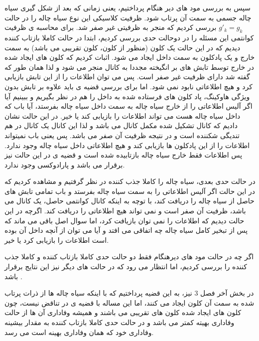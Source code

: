 سپس به بررسی مود های دیر هنگام پرداختیم، یعنی زمانی که بعد از شکل گیری سیاه چاله جسمی به سمت آن پرتاب شود. ظرفیت کلاسیکی این نوع سیاه چاله را در حالت
$g'_k = g_k$
بررسی کردیم که منجر به ظرفیتی غیر صفر شد. برای محاسبه ی ظرفیت کوانتمی
این مسئله را در دوحالت حدی بررسی کردیم، ابتدا در حالت کاملا بازتاب کننده دیدیم که در این حالت یک کلون (منظور از کلون، کلون تقریبی می باشد)
به سمت خارج و یک پادکلون به سمت داخل ایجاد می شود. اثبات کردیم که کلون های ایجاد شده در خارج توسط تابش های بر انگیخته مجددا به کانال 
منجر می شود و لذا همان طور که گفته شد دارای ظرفیت غیر صفر است. پس می توان اطلاعات را از این تابش بازیابی کرد و هیچ اطلاعاتی نابود نمی شود. اما برای بررسی قضیه ی 
باید علاوه بر تابش بدون ویژگی هاوکینگ، پاد کلون های فرستاده شده به داخل را هم در نظر بگیریم و ببینیم آیا اگر آلیس اطلاعاتی را از خارج سیاه چاله به سمت داخل سیاه چاله بفرستد، آیا باب که داخل سیاه چاله هست می تواند اطلاعات را بازیابی کند یا خیر. در این حالت نشان دادیم که کانال تشکیل شده مکمل کانال 
می باشد و لذا این کانال یک کانال در هم تندیگی شکننده است و در نتیجه ظرفیت آن صفر می باشد. پس یعنی باب نمیتواند اطلاعات را از این پادکلون ها بازیابی کند و هیچ اطلاعاتی داخل سیاه چاله وجود ندارد. پس اطلاعات فقط خارج سیاه چاله بازتابیده شده است و قضیه ی 
در این حالت نیز برقرار می باشد و پارادوکسی وجود ندارد.




در حالت حدی بعدی، سیاه چاله را کاملا جذب کننده در نظر گرفتیم و مشاهده کردیم که در این حالت اگر آلیس اطلاعاتی را به سمت سیاه چاله بفرستد و باب تمامی تابش های حاصل از سیاه چاله را دریافت کند، با توچه به اینکه کانال کوانتمی حاصل، یک کانال 
می باشد، ظرفیت آن صفر است و نمی تواند هیچ اطلاعاتی را دریافت کند. اگرچه در این حالت دیدیم که اطلاعات را نمی توان بازیافت کرد، اما سوال اصل باقی می ماند که پس از تبخیر کامل سیاه چاله چه اتفاقی می افتد و آیا می توان از آنچه داخل آن بوده است اطلاعات را بازیابی کرد یا خیر.

اگر چه در حالت مود های دیرهنگام فقط دو حالت حدی کاملا بازتاب کننده و کاملا جذب کننده را بررسی کردیم، اما انتظار می رود که در حالت های دیگر نیز این نتایج برقرار باشد
\cite{qit}
.

در بخش آخر فصل 3 نیز، به این قضیه پرداختیم که با اینکه سیاه چاله ها از ذرات پرتاب شده به سمت آن کلون ایجاد می کنند، اما این مساله با قضیه ی 
در تناقض نیست، چون کلون های ایجاد شده کلون های تقریبی می باشند و همیشه وفاداری آن ها از حالت وفاداری بهیته کمتر می باشد و در حالت حدی کاملا بازتاب کننده به مقدار بیشینه وفاداری خود که همان وفاداری بهینه است می رسد.
